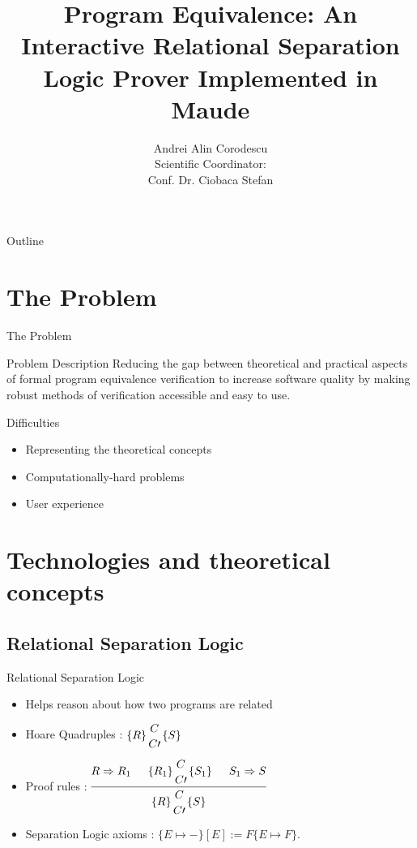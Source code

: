 \documentclass{beamer}
\title{Program Equivalence: An Interactive Relational Separation Logic Prover Implemented in Maude}
\author{Andrei Alin Corodescu \\ \vspace{1.5cm} Scientific Coordinator: \\ Conf. Dr. Ciobaca Stefan}
\institute[Alexandru Ioan Cuza University of Iasi] %
\newcommand{\hq}[4]{
	\left\{{#1}\right\}
	\let\scriptstyle\textstyle 
	\substack{{#2} \\ \\ 	\let\scriptstyle\textstyle {#3}} 
	\left\{{#4}\right\}
}
\begin{document}
\begin{frame}
  \titlepage
\end{frame}

\begin{frame}{Outline}
  \tableofcontents
\end{frame}

\section{The Problem}

\begin{frame}{The Problem}
\begin{block}{Problem Description}
    Reducing the gap between theoretical and practical aspects of formal program equivalence verification to increase software quality by making robust methods of verification accessible and easy to use.
    \pause
\end{block}
	\begin{block}{Difficulties}
		\begin{itemize}
			\item Representing the theoretical concepts
			\item Computationally-hard problems
			\item User experience
		\end{itemize}
	\end{block}
\end{frame}

\section{Technologies and theoretical concepts}

\subsection{Relational Separation Logic}
\begin{frame}{Relational Separation Logic}
\begin{itemize}
	\item Helps reason about how two programs are related
	\item {Hoare Quadruples : \(\hq{R}{C}{C\prime}{S}\)}
	\item {Proof rules : 	\(
		\begin{prooftree}
		\Hypo{R \Rightarrow R_1}
		\Hypo{\hq{R_1}{C}{C\prime}{S_1}}
		\Hypo{S_1 \Rightarrow S}
		\Infer 3 {\hq{R}{C}{C\prime}{S}}
		\end{prooftree}	
		\)
	}
	\item Separation Logic axioms : \(
	\{E \mapsto -\} [E] := F \{E \mapsto F\}.
	\)
\end{itemize}
\end{frame}
\end{document}
